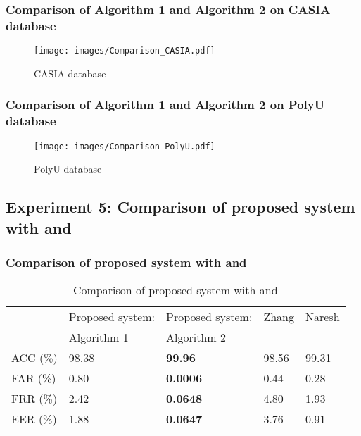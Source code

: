 \documentclass{beamer}
\begin{document}
\begin{frame}
\frametitle{Comparison of Algorithm 1 and Algorithm 2 on CASIA database}
\begin{figure}
	\begin{center}
	\texttt{[image: images/Comparison\_CASIA.pdf]}
	\caption{CASIA database}
	\end{center}
	\end{figure}
\end{frame}


\begin{frame}
\frametitle{Comparison of Algorithm 1 and Algorithm 2 on PolyU database}
\begin{figure}
	\begin{center}
	\texttt{[image: images/Comparison\_PolyU.pdf]}
	\caption{PolyU database}
	\end{center}
	\end{figure}
\end{frame}

\subsection{Experiment 5: Comparison of proposed system with \cite{ieee} and \cite{naresh}}
\begin{frame}
\frametitle{Comparison of proposed system with \cite{ieee} and \cite{naresh}}
\begin{table}[ht]
\centering 
\begin{tabular}{| l | l | l | l | l |}
    \hline
     & Proposed system: & Proposed system:  & Zhang \cite{ieee} & Naresh \cite{naresh}\\
    & Algorithm 1 & Algorithm 2 & &\\
    \hline
    \hline
    ACC (\%) & 98.38 & \textbf{99.96} & 98.56 & 99.31 \\ \hline
    FAR (\%)&  0.80	& \textbf{0.0006} & 0.44& 0.28 \\ \hline
    FRR	(\%)& 2.42	& \textbf{0.0648} & 4.80 & 1.93 \\\hline
    EER (\%)& 1.88 	&  \textbf{0.0647} & 3.76 & 0.91\\
    \hline
\end{tabular}
\caption{Comparison of proposed system with \cite{ieee} and \cite{naresh}\label{table:compare_zhang_naresh}}
\end{table}
\end{frame}
\end{document}
